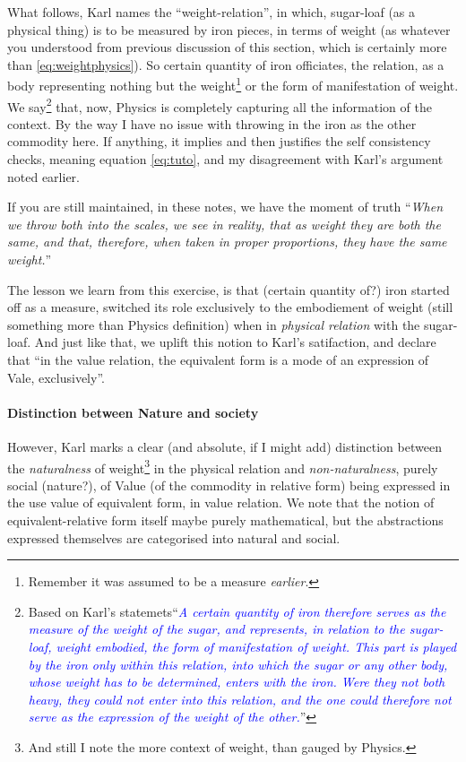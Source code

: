 \documentclass[12pt]{extarticle}
\theoremstyle{definition}
\begin{document}
 What follows, Karl names the ``weight-relation'', in which, sugar-loaf (as a physical thing) is to be measured by iron pieces, in terms of weight (as whatever you understood from previous discussion of this section, which is certainly more than \ref{eq:weightphysics}).  So certain quantity of iron officiates, the relation, as a body representing nothing but the weight\footnote{Remember it was assumed to be a measure \emph{earlier}.} or the form of manifestation of weight.  We say\footnote{Based on Karl's statemets\newline ``\emph{\textcolor{blue}{A certain quantity of iron therefore serves as the measure of the weight of the sugar,
and represents, in relation to the sugar-loaf, weight embodied, the form of manifestation of
weight. This part is played by the iron only within this relation, into which the sugar or any other body, whose weight has to be determined, enters with the iron. Were they not both heavy, they
could not enter into this relation, and the one could therefore not serve as the expression of the
weight of the other.}}''} that, now, Physics is completely capturing all the information of the context.  By the way I have no issue with throwing in the iron as the other commodity here.  If anything, it implies and then justifies the self consistency checks, meaning equation \ref{eq:tuto}, and my disagreement with Karl's argument noted earlier.

If you are still maintained, in these notes, we have the moment of truth
``\emph{When we throw both into the scales, we see in reality, that as weight they are
  both the same, and that, therefore, when taken in proper proportions, they have the same weight.}''

The lesson we learn from this exercise, is that (certain quantity of?) iron started off as a measure, switched its role exclusively to the embodiement of weight (still something more than Physics definition) when in \emph{physical relation} with the sugar-loaf.  And just like that, we uplift this notion to Karl's satifaction, and declare that ``in the value relation, the equivalent form is a mode of an expression of Vale, exclusively''.


\paragraph{Distinction between Nature and society}
However, Karl marks a clear (and absolute, if I might add) distinction between the \emph{naturalness} of weight\footnote{And still I note the more context of weight, than gauged by Physics.} in the physical relation and \emph{non-naturalness}, purely social (nature?), of Value (of the commodity in relative form) being expressed in the use value of equivalent form, in value relation.  We note that the notion of equivalent-relative form itself maybe purely mathematical, but the abstractions expressed themselves are categorised into natural and social.
\end{document}
